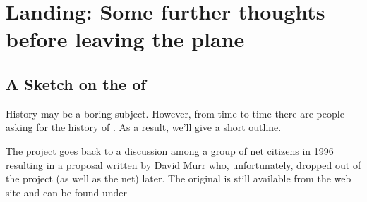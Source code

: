
\chapter{Landing: Some further thoughts before leaving the plane\label{landing}}


\section{A Sketch on the  of \FlightGear{}}

History may be a boring subject. However, from time to time there are people asking for the history of \FlightGear{}. As a result, we'll give a short outline.

The \FlightGear{} project goes back to a discussion among a group of net citizens in 1996 resulting in a proposal written by David Murr who, unfortunately, dropped out of the project (as well as the net) later. The original  is still available
from the \FlightGear{} web site and can be found under
 \medskip

